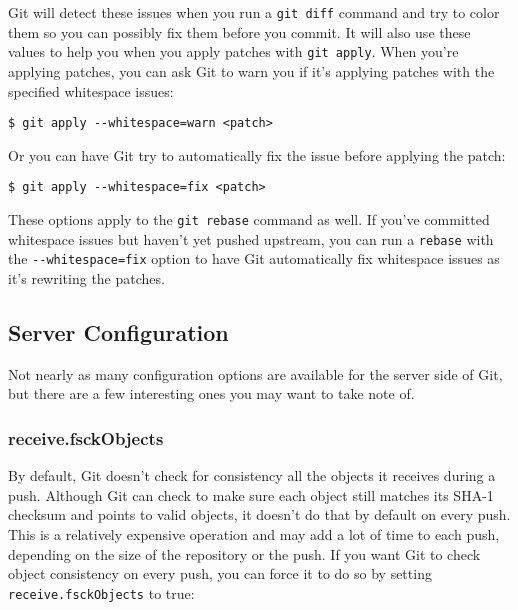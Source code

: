 \documentclass[a4paper]{book}
\begin{document}
Git will detect these issues when you run a \texttt{git diff} command and try to color them so you can possibly fix them before you commit. It will also use these values to help you when you apply patches with \texttt{git apply}. When you're applying patches, you can ask Git to warn you if it's applying patches with the specified whitespace issues:

\begin{shaded}\begin{verbatim}
$ git apply --whitespace=warn <patch>
\end{verbatim}\end{shaded}

Or you can have Git try to automatically fix the issue before applying the patch:

\begin{shaded}\begin{verbatim}
$ git apply --whitespace=fix <patch>
\end{verbatim}\end{shaded}

These options apply to the \texttt{git rebase} command as well. If you've committed whitespace issues but haven't yet pushed upstream, you can run a \texttt{rebase} with the \texttt{-{}-whitespace=fix} option to have Git automatically fix whitespace issues as it's rewriting the patches.

\subsection{Server Configuration}

Not nearly as many configuration options are available for the server side of Git, but there are a few interesting ones you may want to take note of.

\subsubsection{receive.fsckObjects}

By default, Git doesn't check for consistency all the objects it receives during a push. Although Git can check to make sure each object still matches its SHA-1 checksum and points to valid objects, it doesn't do that by default on every push. This is a relatively expensive operation and may add a lot of time to each push, depending on the size of the repository or the push. If you want Git to check object consistency on every push, you can force it to do so by setting \texttt{receive.fsckObjects} to true:
\end{document}
